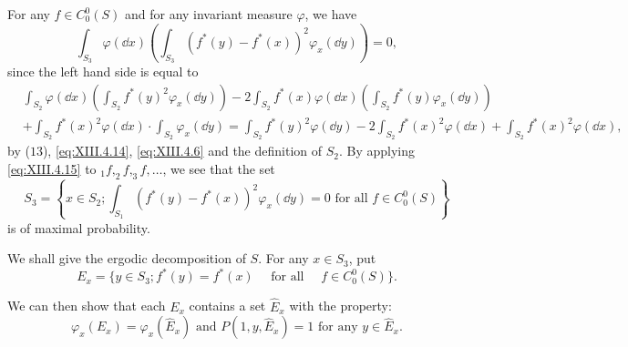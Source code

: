For any $f \in C_0^0(S)$ and for any invariant measure $\varphi$, we have 
\begin{equation}\label{eq:XIII.4.15}
\int_ {S _{3}} \varphi (\dd x) \left(\int_ {S _{3}} \left(f ^{*} (y) - f ^{*} (x)\right) ^{2} \varphi_{x} (\dd y)\right) = 0,
\end{equation}
since the left hand side is equal to 
\[
\begin{aligned}
&\int_ {S _{2}} \varphi (\dd x) \left(\int_ {S _{2}} f ^{*} (y) ^{2} \varphi_{x} (\dd y)\right)  - 2 \int_ {S _{2}} f ^{*} (x) \varphi (\dd x) \left(\int_ {S _{2}} f ^{*} (y) \varphi_{x} (\dd y)\right) \\
&+ \int_ {S _{2}} f ^{*} (x) ^{2} \varphi (\dd x) \cdot \int_ {S _{2}} \varphi_{x} (\dd y) = \int_ {S _{2}} f ^{*} (y) ^{2} \varphi (\dd y) - 2 \int_ {S _{2}} f ^{*} (x) ^{2} \varphi (\dd x) + \int_ {S _{2}} f ^{*} (x) ^{2} \varphi (\dd x),
\end{aligned}
\]
by ($13$), \eqref{eq:XIII.4.14}, \eqref{eq:XIII.4.6} and the definition of $S_{2}$. By applying \eqref{eq:XIII.4.15} to $_{1}f, _{2}f, _{3}f, \ldots$, we see that the set 
\[
S _{3} = \left\{x \in S _{2}; \int_ {S _{1}} (f ^{*} (y) - f ^{*} (x)) ^{2} \varphi_{x} (\dd y) = 0 \text{ for all } f \in C _{0} ^{0} (S) \right\}
\]
is of maximal probability. 

We shall give the ergodic decomposition of $S$. For any $x \in S_3$, put 
\begin{equation}\label{eq:XIII.4.16}
E _{x} = \{y \in S _{3}; f ^{*} (y) = f ^{*} (x) \quad \text{ for all } \quad f \in C _{0} ^{0} (S) \}.
\end{equation}

We can then show that each $E_x$ contains a set $\hat{E}_x$ with the property: 
\begin{equation}\label{eq:XIII.4.17}
\varphi_{x} (E _{x}) = \varphi_{x} (\hat {E} _{x}) \text{ and } P (1, y, \hat {E} _{x}) = 1 \text{ for any } y \in \hat {E} _{x}.
\end{equation}

